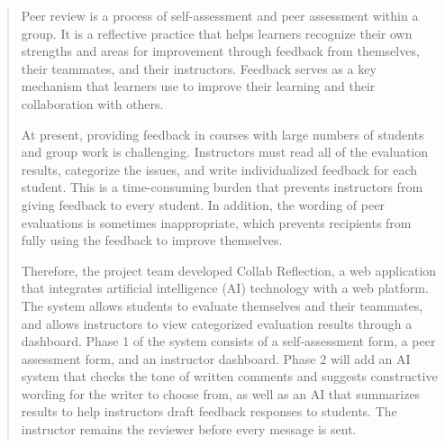 \begin{abstract}
Peer review is a process of self-assessment and peer assessment within a group. It is a reflective practice that helps learners recognize their own strengths and areas for improvement through feedback from themselves, their teammates, and their instructors. Feedback serves as a key mechanism that learners use to improve their learning and their collaboration with others.

At present, providing feedback in courses with large numbers of students and group work is challenging. Instructors must read all of the evaluation results, categorize the issues, and write individualized feedback for each student. This is a time-consuming burden that prevents instructors from giving feedback to every student. In addition, the wording of peer evaluations is sometimes inappropriate, which prevents recipients from fully using the feedback to improve themselves.

Therefore, the project team developed Collab Reflection, a web application that integrates artificial intelligence (AI) technology with a web platform. The system allows students to evaluate themselves and their teammates, and allows instructors to view categorized evaluation results through a dashboard. Phase 1 of the system consists of a self-assessment form, a peer assessment form, and an instructor dashboard. Phase 2 will add an AI system that checks the tone of written comments and suggests constructive wording for the writer to choose from, as well as an AI that summarizes results to help instructors draft feedback responses to students. The instructor remains the reviewer before every message is sent.
\end{abstract}

%

